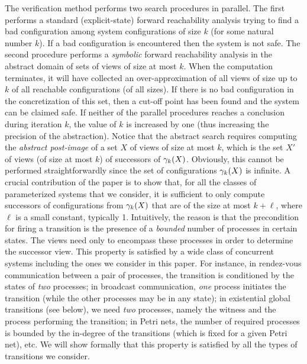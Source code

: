The verification method performs two search procedures in parallel.
%
The first performs a standard (explicit-state) forward reachability
analysis trying to find a bad configuration among system
configurations of size $k$ (for some natural number $k$).
%
If a bad configuration is encountered then the system is not safe.
%
The second procedure performs a {\it symbolic} forward reachability
analysis in the abstract domain of sets of views of size at most $k$.
%
%
When the computation terminates, it will have collected an 
over-approximation of all views of size up to $k$ of all reachable configurations (of all sizes).
%
If there is no bad configuration in the concretization of this set, 
then a cut-off point has been found and the system can be claimed safe.
%
If neither of the parallel procedures reaches a conclusion during iteration
$k$, the value of $k$ is increased by one (thus increasing
the precision of the abstraction).
%
Notice that the abstract search requires computing the \emph{abstract post-image} of a set $X$ of 
views of size at most $k$, which is the set $X'$ of views (of size at most $k$) of successors of $\gamma_{k} (X)$.
%
Obviously, this cannot be performed straightforwardly since
the set of configurations $\gamma_{k} (X)$ is infinite.
%
A crucial contribution of the paper is to show that,
for all the classes of parameterized systems that we consider,
it is sufficient to only compute successors of configurations from 
$\gamma_{k} (X)$ that are of the size at most $k+\ell$, where $\ell$ is a small constant, typically 1.
%
Intuitively, the reason is that the precondition for firing a
transition is the presence of a {\it bounded } number of processes in
certain states.
%
The views need only to encompass these processes in order to determine
the successor view.
%
This property is satisfied by a wide class of concurrent systems including the
ones we consider in this paper.
%
For instance, in rendez-vous communication between a pair of
processes, the transition is conditioned by the states of {\it two}
processes; in broadcast communication, {\it one} process initiates the
transition (while the other processes may be in any state); in
existential global transitions (see below), we need {\it two}
processes, namely the witness and the process performing the
transition; in Petri nets, the number of required processes is bounded
by the in-degree of the transitions (which is fixed for a given Petri
net), etc.
%
We will show formally that this property is satisfied by all the types
of transitions we consider.

